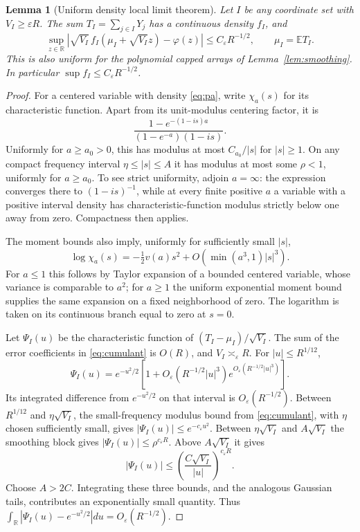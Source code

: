 \documentclass[11pt,a4paper]{article}
\numberwithin{equation}{section}
\newtheorem{lemma}[theorem]{Lemma}
\theoremstyle{definition}
\theoremstyle{remark}
\newcommand{\E}{\mathbb E}
\newcommand{\R}{\mathbb R}
\newcommand{\ph}{\varphi}
\newcommand{\eps}{\varepsilon}
\begin{document}
\begin{lemma}[Uniform density local limit theorem]
\label{lem:llt}
Let $I$ be any coordinate set with $V_I\ge\eps R$. The sum
$T_I=\sum_{j\in I}Y_j$ has a continuous density $f_I$, and
\begin{equation}
 \sup_{z\in\R}
 \left|\sqrt{V_I}\,f_I(\mu_I+\sqrt{V_I}z)-\ph(z)\right|
 \le C_\eps R^{-1/2},\qquad \mu_I=\E T_I.
 \label{eq:llt}
\end{equation}
This is also uniform for the polynomial capped arrays of
Lemma~\ref{lem:smoothing}. In particular
$\sup f_I\le C_\eps R^{-1/2}$.
\end{lemma}
\begin{proof}
For a centered variable with density \eqref{eq:pa}, write $\chi_a(s)$
for its characteristic function. Apart from its unit-modulus centering
factor, it is
\begin{equation}
 \frac{1-e^{-(1-is)a}}{(1-e^{-a})(1-is)}. \label{eq:cf}
\end{equation}
Uniformly for $a\ge a_0>0$, this has modulus at most $C_{a_0}/|s|$
for $|s|\ge1$. On any compact frequency interval
$\eta\le|s|\le A$ it has modulus at most some $\rho<1$,
uniformly for $a\ge a_0$. To see strict uniformity, adjoin $a=\infty$:
the expression converges there to $(1-is)^{-1}$, while at every finite
positive $a$ a variable with a positive interval density has
characteristic-function modulus strictly below one away from zero.
Compactness then applies.

The moment bounds also imply, uniformly for sufficiently small $|s|$,
\begin{equation}
 \log\chi_a(s)=-\tfrac12v(a)s^2+
 O\!\left(\min(a^3,1)|s|^3\right). \label{eq:cumulant}
\end{equation}
For $a\le1$ this follows by Taylor expansion of a bounded centered
variable, whose variance is comparable to $a^2$; for $a\ge1$ the
uniform exponential moment bound supplies the same expansion on a
fixed neighborhood of zero. The logarithm is taken on its continuous
branch equal to zero at $s=0$.

Let $\Psi_I(u)$ be the characteristic function of
$(T_I-\mu_I)/\sqrt{V_I}$. The sum of the error coefficients in
\eqref{eq:cumulant} is $O(R)$, and $V_I\asymp_\eps R$.
For $|u|\le R^{1/12}$,
\[
 \Psi_I(u)=e^{-u^2/2}
 \left[1+O_\eps(R^{-1/2}|u|^3)
                e^{O_\eps(R^{-1/2}|u|^3)}\right].
\]
Its integrated difference from $e^{-u^2/2}$ on that interval is
$O_\eps(R^{-1/2})$. Between $R^{1/12}$ and
$\eta\sqrt{V_I}$, the small-frequency modulus bound from
\eqref{eq:cumulant}, with $\eta$ chosen sufficiently small, gives
$|\Psi_I(u)|\le e^{-c_\eps u^2}$. Between
$\eta\sqrt{V_I}$ and $A\sqrt{V_I}$ the smoothing block gives
$|\Psi_I(u)|\le\rho^{c_\eps R}$. Above $A\sqrt{V_I}$ it gives
\[
 |\Psi_I(u)|\le
 \left(\frac{C\sqrt{V_I}}{|u|}\right)^{c_\eps R}.
\]
Choose $A>2C$. Integrating these three bounds, and the analogous
Gaussian tails, contributes an exponentially small quantity.
Thus $\int_\R|\Psi_I(u)-e^{-u^2/2}|du=O_\eps(R^{-1/2})$.


\end{proof}
\end{document}
